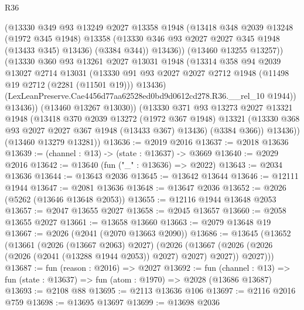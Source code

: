 \begin{lexlean}{R36}
\begin{coremodule}
                (@13330
                  @349
                  @93
                  @13249
                  @2027
                  @13358
                  @1948
                  (@13418
                    @348
                    @2039
                    @13248
                    (@1972 @345 @1948)
                    @13358
                    (@13330 @346 @93 @2027 @2027 @345 @1948 (@13433 @345) @13436)
                    (@3384 @344))
                  @13436))
              (@13460 @13255 @13257))
            (@13330
              @360
              @93
              @13261
              @2027
              @13031
              @1948
              (@13314
                @358
                @94
                @2039
                @13027
                @2714
                @13031
                (@13330
                  @91
                  @93
                  @2027
                  @2027
                  @2712
                  @1948
                  (@11498 @19 @2712 (@2281 (@11501 @19)))
                  @13436)
                (LexLeanPreserve.Cae4456d77aa62528ed0bd9d0612cd278.R36.__rel_10 @1944))
              @13436))
          (@13460 @13267 @13030))
        (@13330
          @371
          @93
          @13273
          @2027
          @13321
          @1948
          (@13418
            @370
            @2039
            @13272
            (@1972 @367 @1948)
            @13321
            (@13330 @368 @93 @2027 @2027 @367 @1948 (@13433 @367) @13436)
            (@3384 @366))
          @13436))
      (@13460 @13279 @13281))
@13636 := @2019 @2016
@13637 := @2018 @13636
@13639 := (channel : @13) -> (state : @13637) -> @3669
@13640 := @2029 @2016
@13642 := @13640 (fun ("_" : @13636) => @2022)
@13643 := @2034 @13636
@13644 := @13643 @2036
@13645 := @13642 @13644
@13646 := @12111 @1944
@13647 := @2081 @13636
@13648 := @13647 @2036
@13652 := @2026 (@5262 (@13646 @13648 @2053))
@13655 := @12116 @1944 @13648 @2053
@13657 := @2047 @13655 @2027
@13658 := @2045 @13657
@13660 := @2058 @13655 @2027
@13661 := @13658 @13660
@13663 := @2079 @13648 @19
@13667 := @2026 (@2041 (@2070 @13663 @2090))
@13686 := @13645
    (@13652
      (@13661
        (@2026 (@13667 @2063) @2027)
        (@2026
          (@13667 (@2026 (@2026 (@2026 (@2041 (@13288 @1944 @2053)) @2027) @2027) @2027))
          @2027)))
@13687 := fun (reason : @2016) => @2027
@13692 := fun (channel : @13) => fun (state : @13637) => fun (atom : @1970) => @2028 (@13686 @13687)
@13693 := @2108 @88
@13695 := @2113 @13636 @106
@13697 := @2116 @2016 @759
@13698 := @13695 @13697
@13699 := @13698 @2036

\end{coremodule}
\end{lexlean}

